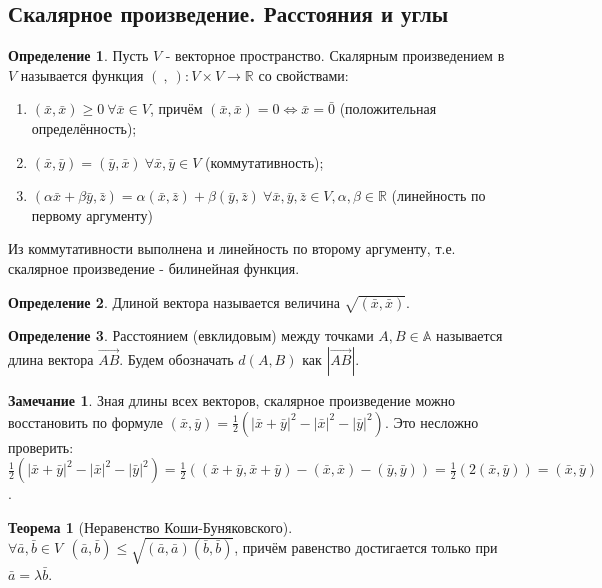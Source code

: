 \documentclass[a4paper, 12pt]{article}
\theoremstyle{definition}
\newtheorem*{definition}{Определение}
\newtheorem*{theorem}{Теорема}
\newtheorem*{remark}{Замечание}
\begin{document}
	\subsection{Скалярное произведение. Расстояния и углы}
	\begin{definition}
		Пусть $V$ - векторное пространство. Скалярным произведением в $V$ называется функция $(\ ,\ ) : V \times V \rightarrow \mathbb{R}$ со свойствами:
		\begin{enumerate}
			\item $(\bar{x}, \bar{x}) \geqslant 0 \ \forall \bar{x} \in V$, причём $(\bar{x}, \bar{x}) = 0 \Leftrightarrow \bar{x} = \bar{0}$ (положительная определённость);
			\item $(\bar{x}, \bar{y}) = (\bar{y}, \bar{x}) \ \forall \bar{x}, \bar{y} \in V$ (коммутативность);
			\item $(\alpha\bar{x} + \beta\bar{y}, \bar{z}) = \alpha(\bar{x}, \bar{z}) + \beta(\bar{y}, \bar{z}) \ \forall \bar{x}, \bar{y}, \bar{z} \in V, \alpha,\beta \in \mathbb{R}$ (линейность по первому аргументу)
		\end{enumerate} 
	\end{definition}
	Из коммутативности выполнена и линейность по второму аргументу, т.е. скалярное произведение - билинейная функция.
	\begin{definition}
		Длиной вектора называется величина $\sqrt{(\bar{x}, \bar{x})}$.
	\end{definition}
	\begin{definition}
		Расстоянием (евклидовым) между точками $A,B \in \mathbb{A}$ называется длина вектора $\overrightarrow{AB}$. Будем обозначать $d(A, B)$ как $|\overrightarrow{AB}|$. 
	\end{definition}
	\begin{remark}
		Зная длины всех векторов, скалярное произведение можно восстановить по формуле $(\bar{x}, \bar{y}) = \frac{1}{2}(|\bar{x} + \bar{y}|^2 - |\bar{x}|^2 - |\bar{y}|^2)$. Это несложно проверить: \\
		$\frac{1}{2}(|\bar{x} + \bar{y}|^2 - |\bar{x}|^2 - |\bar{y}|^2) = \frac{1}{2}((\bar{x} + \bar{y}, \bar{x} + \bar{y}) - (\bar{x}, \bar{x}) - (\bar{y}, \bar{y})) = \frac{1}{2}(2(\bar{x}, \bar{y})) = (\bar{x}, \bar{y})$.
	\end{remark}
	\begin{theorem}[Неравенство Коши-Буняковского]
		$\forall \bar{a}, \bar{b} \in V \ \ (\bar{a}, \bar{b}) \leqslant \sqrt{(\bar{a}, \bar{a})(\bar{b}, \bar{b})}$, причём равенство достигается только при $\bar{a} = \lambda\bar{b}$.
	\end{theorem}
\end{document}
